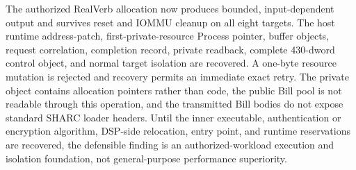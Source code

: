 \documentclass[10pt,twocolumn,twoside]{article}
\begin{document}
The authorized RealVerb allocation now produces bounded, input-dependent output
and survives reset and IOMMU cleanup on all eight targets. The host runtime
address-patch, first-private-resource Process pointer, buffer objects, request
correlation, completion record, private readback, complete 430-dword control
object, and normal target isolation are recovered. A
one-byte resource mutation is rejected and recovery permits an immediate exact
retry. The private object contains allocation pointers rather than code, the
public Bill pool is not readable through this operation, and the transmitted
Bill bodies do not expose standard SHARC loader headers. Until the inner
executable, authentication or encryption algorithm,
DSP-side relocation, entry point, and runtime reservations are recovered, the
defensible finding is an authorized-workload execution and isolation
foundation, not general-purpose performance superiority.

{\footnotesize


}
\end{document}
